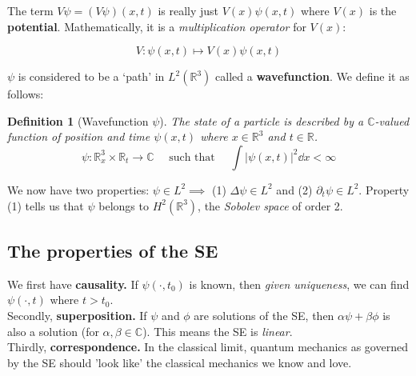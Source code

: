 \documentclass[10pt,a4paper]{report}
\newcommand{\R}{\mathbb{R}}
\newcommand{\C}{\mathbb{C}}
\newtheorem{definition}{Definition}
\begin{document}
The term $V\psi = (V\psi)(x,t)$ is really just $V(x)\psi(x,t)$ where $V(x)$ is the \textbf{potential}. Mathematically, it is a \textit{multiplication operator} for $V(x)$:

\begin{equation}\label{vmult}
    V \colon \psi(x,t) \mapsto V(x) \psi(x,t)
\end{equation}

$\psi$ is considered to be a `path' in $L^2 (\R^3)$ called a \textbf{wavefunction}. We define it as follows:

\begin{definition}[Wavefunction $\psi$] The state of a particle is described by a $\C$-valued function of position and time $\psi(x,t)$ where $x \in \R^3$ and $t \in \R$. 
    \begin{equation}\label{wavefnmathdef}
        \psi \colon \R^3_x \times \R_t \to \C \quad \text{ such that } \quad \int |\psi(x,t)|^2 \dd x < \infty
    \end{equation}
\end{definition}

We now have two properties: $\psi \in L^2 \implies$ (1) $\Delta \psi \in L^2$ and (2) $\partial_t \psi \in L^2$. Property (1) tells us that $\psi$ belongs to $H^2 (\R^3)$, the \textit{Sobolev space} of order 2. 

\subsection{The properties of the SE}
We first have \textbf{causality.} If $\psi(\cdot, t_0)$ is known, then \textit{given uniqueness}, we can find $\psi(\cdot, t)$ where $t>t_0$.\\
Secondly, \textbf{superposition.} If $\psi$ and $\phi$ are solutions of the SE, then $\alpha \psi + \beta \phi$ is also a solution (for $\alpha, \beta \in \C$). This means the SE is \textit{linear}.\\
Thirdly, \textbf{correspondence.} In the classical limit, quantum mechanics as governed by the SE should 'look like' the classical mechanics we know and love.
\end{document}
